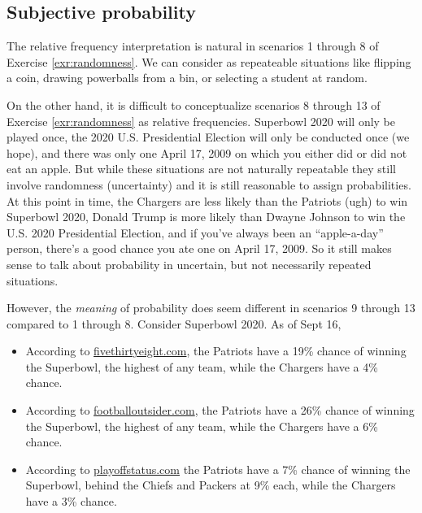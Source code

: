 \documentclass[
]{book}
\providecommand{\tightlist}{%
  \setlength{\itemsep}{0pt}\setlength{\parskip}{0pt}}
\theoremstyle{definition}
\theoremstyle{definition}
\theoremstyle{definition}
\theoremstyle{remark}
\begin{document}
\hypertarget{subjective-probability}{%
\subsection{Subjective probability}\label{subjective-probability}}

The relative frequency interpretation is natural in scenarios 1 through 8 of Exercise \ref{exr:randomness}. We can consider as repeateable situations like flipping a coin, drawing powerballs from a bin, or selecting a student at random.

On the other hand, it is difficult to conceptualize scenarios 8 through 13 of Exercise \ref{exr:randomness} as relative frequencies. Superbowl 2020 will only be played once, the 2020 U.S. Presidential Election will only be conducted once (we hope), and there was only one April 17, 2009 on which you either did or did not eat an apple. But while these situations are not naturally repeatable they still involve randomness (uncertainty) and it is still reasonable to assign probabilities. At this point in time, the Chargers are less likely than the Patriots (ugh) to win Superbowl 2020, Donald Trump is more likely than Dwayne Johnson to win the U.S. 2020 Presidential Election, and if you've always been an ``apple-a-day'' person, there's a good chance you ate one on April 17, 2009. So it still makes sense to talk about probability in uncertain, but not necessarily repeated situations.

However, the \emph{meaning} of probability does seem different in scenarios 9 through 13 compared to 1 through 8. Consider Superbowl 2020. As of Sept 16,

\begin{itemize}
\tightlist
\item
  According to \href{https://projects.fivethirtyeight.com/2019-nfl-predictions/}{fivethirtyeight.com}, the Patriots have a 19\% chance of winning the Superbowl, the highest of any team, while the Chargers have a 4\% chance.
\item
  According to \href{https://www.footballoutsiders.com/stats/playoffodds}{footballoutsider.com}, the Patriots have a 26\% chance of winning the Superbowl, the highest of any team, while the Chargers have a 6\% chance.
\item
  According to \href{http://www.playoffstatus.com/nfl/nflpostseasonprob.html}{playoffstatus.com} the Patriots have a 7\% chance of winning the Superbowl, behind the Chiefs and Packers at 9\% each, while the Chargers have a 3\% chance.
\end{itemize}
\end{document}

